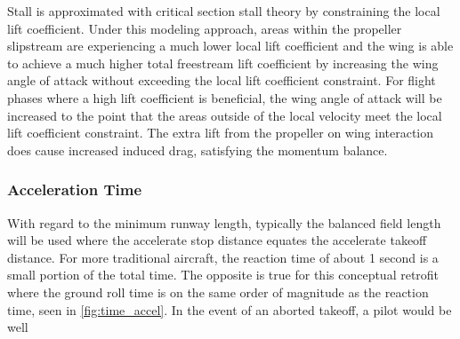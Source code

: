 \documentclass[conf]{new-aiaa}
\begin{document}
Stall is approximated with critical section stall theory by constraining the local lift coefficient. Under this modeling approach, areas within the propeller slipstream are experiencing a much lower local lift coefficient and the wing is able to achieve a much higher total freestream lift coefficient by increasing the wing angle of attack without exceeding the local lift coefficient constraint. For flight phases where a high lift coefficient is beneficial, the wing angle of attack will be increased to the point that the areas outside of the local velocity meet the local lift coefficient constraint. The extra lift from the propeller on wing interaction does cause increased induced drag, satisfying the momentum balance.

\subsubsection{Acceleration Time}


With regard to the minimum runway length, typically the balanced field length will be used where the accelerate stop distance equates the accelerate takeoff distance. For more traditional aircraft, the reaction time of about 1 second is a small portion of the total time. The opposite is true for this conceptual retrofit where the ground roll time is on the same order of magnitude as the reaction time, seen in \cref{fig:time_accel}. In the event of an aborted takeoff, a pilot would be well
\end{document}
